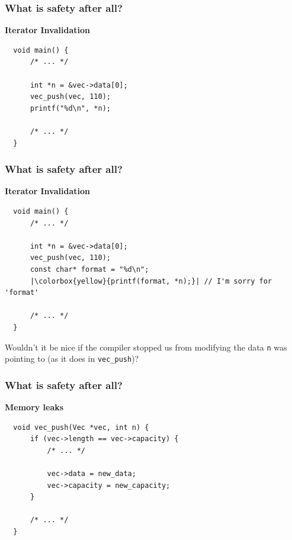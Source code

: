 \documentclass[aspectratio=1610,t]{beamer}
\begin{document}

\begin{frame}[fragile]
\frametitle{What is safety after all?}
\textbf{Iterator Invalidation}

\begin{verbatim}
  void main() {
      /* ... */

      int *n = &vec->data[0];
      vec_push(vec, 110);
      printf("%d\n", *n);

      /* ... */
  }
\end{verbatim}

\end{frame}


\begin{frame}[fragile]
\frametitle{What is safety after all?}
\textbf{Iterator Invalidation}

\begin{verbatim}
  void main() {
      /* ... */

      int *n = &vec->data[0];
      vec_push(vec, 110);
      const char* format = "%d\n";
      |\colorbox{yellow}{printf(format, *n);}| // I'm sorry for 'format'

      /* ... */
  }
\end{verbatim}

Wouldn’t it be nice if the compiler stopped us from modifying the data \texttt{n} was pointing to (as it does in \texttt{vec\_push})?

\end{frame}


\begin{frame}[fragile]
\frametitle{What is safety after all?}
\textbf{Memory leaks}

\begin{verbatim}
  void vec_push(Vec *vec, int n) {
      if (vec->length == vec->capacity) {
          /* ... */
    
          vec->data = new_data;
          vec->capacity = new_capacity;
      }
    
      /* ... */
  }
\end{verbatim}

\end{frame}

\end{document}
